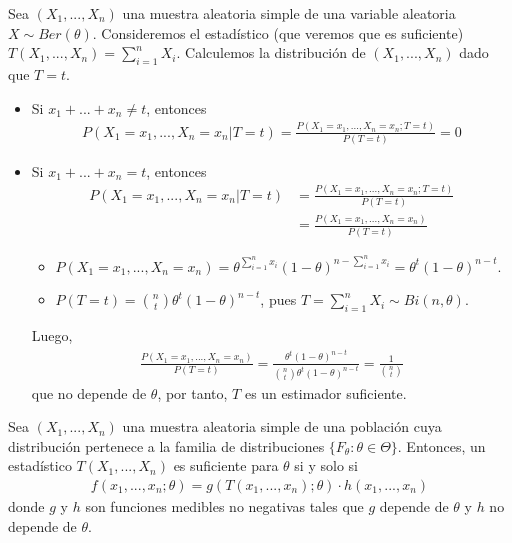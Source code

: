 \begin{ejemplo}
Sea $(X_1,...,X_n)$ una muestra aleatoria simple de una variable aleatoria $X \sim Ber(\theta)$. Consideremos el estadístico (que veremos que es suficiente) $T(X_1,...,X_n) = \sum_{i=1}^{n}{X_i}$. Calculemos la distribución de $(X_1,...,X_n)$ dado que $T = t$.
\begin{itemize}
    \item Si $x_1 + ... + x_n \not = t$, entonces
    \begin{align*}
        P(X_1 = x_1, ..., X_n = x_n | T = t) = \frac{P(X_1 = x_1, ..., X_n = x_n ; T = t)}{P(T = t)} = 0 
    \end{align*}
    \item Si $x_1 + ... + x_n = t$, entonces
    \begin{align*}
         P(X_1 = x_1, ..., X_n = x_n | T = t) &= \frac{P(X_1 = x_1, ..., X_n = x_n ; T = t)}{P(T = t)} \\
         &= \frac{P(X_1 = x_1, ..., X_n = x_n)}{P(T = t)}
    \end{align*}
    \begin{itemize}
        \item $P(X_1 = x_1, ..., X_n = x_n) = \theta^{\sum_{i=1}^{n}{x_i}}(1-\theta)^{n - \sum_{i=1}^{n}{x_i}} = \theta^{t}(1-\theta)^{n - t}$.
        \item $P(T = t) = \binom{n}{t}\theta^{t}(1-\theta)^{n - t}$, pues $T = \sum_{i=1}^{n}{X_i} \sim Bi(n,\theta)$.
    \end{itemize}
    Luego, 
    \begin{align*}
        \frac{P(X_1 = x_1, ..., X_n = x_n)}{P(T = t)} = \frac{\theta^{t}(1-\theta)^{n - t}}{\binom{n}{t}\theta^{t}(1-\theta)^{n - t}} = \frac{1}{\binom{n}{t}}
    \end{align*}
    que no depende de $\theta$, por tanto, $T$ es un estimador suficiente.
\end{itemize}
\end{ejemplo}

\begin{teo}
Sea $(X_1,...,X_n)$ una muestra aleatoria simple de una población cuya distribución pertenece a la familia de distribuciones $\{F_{\theta} : \theta \in \Theta \}$. Entonces, un estadístico $T(X_1,...,X_n)$ es suficiente para $\theta$ si y solo si
\begin{align*}
    f(x_1,...,x_n;\theta) = g(T(x_1,...,x_n);\theta) \cdot h(x_1,...,x_n)
\end{align*}
donde $g$ y $h$ son funciones medibles no negativas tales que $g$ depende de $\theta$ y $h$ no depende de $\theta$.
\end{teo}

